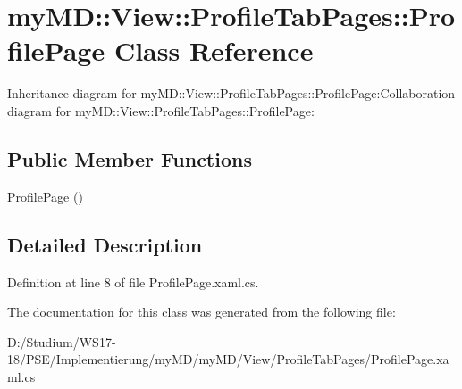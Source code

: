 \hypertarget{classmy_m_d_1_1_view_1_1_profile_tab_pages_1_1_profile_page}{
\section{my\-MD::View::Profile\-Tab\-Pages::Profile\-Page Class Reference}
\label{d1/de7/classmy_m_d_1_1_view_1_1_profile_tab_pages_1_1_profile_page}
}
Inheritance diagram for my\-MD::View::Profile\-Tab\-Pages::Profile\-Page:Collaboration diagram for my\-MD::View::Profile\-Tab\-Pages::Profile\-Page:\subsection*{Public Member Functions}
\begin{CompactItemize}
\item 
\hypertarget{classmy_m_d_1_1_view_1_1_profile_tab_pages_1_1_profile_page_447dc12b65fc28ed95eef5ad275707c5}{
\hyperlink{classmy_m_d_1_1_view_1_1_profile_tab_pages_1_1_profile_page_447dc12b65fc28ed95eef5ad275707c5}{Profile\-Page} ()}
\label{d1/de7/classmy_m_d_1_1_view_1_1_profile_tab_pages_1_1_profile_page_447dc12b65fc28ed95eef5ad275707c5}

\end{CompactItemize}


\subsection{Detailed Description}




Definition at line 8 of file Profile\-Page.xaml.cs.

The documentation for this class was generated from the following file:\begin{CompactItemize}
\item 
D:/Studium/WS17-18/PSE/Implementierung/my\-MD/my\-MD/View/Profile\-Tab\-Pages/Profile\-Page.xaml.cs\end{CompactItemize}

